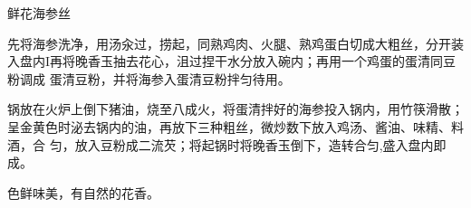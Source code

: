 \begin{recipe}{鲜花海参丝}

\ingredients


\cooking

\step 先将海参洗净，用汤汆过，捞起，同熟鸡肉、火腿、熟鸡蛋白切成大粗丝，分开装
入盘内I再将晚香玉抽去花心，沮过捏干水分放入碗内；再用一个鸡蛋的蛋清同豆粉调成
蛋清豆粉，并将海参入蛋清豆粉拌匀待用。

\step 锅放在火炉上倒下猪油，烧至八成火，将蛋清拌好的海参投入锅内，用竹筷滑散；
呈金黄色时泌去锅内的油，再放下三种粗丝，微炒数下放入鸡汤、酱油、味精、料酒，合
匀，放入豆粉成二流芡；将起锅时将晚香玉倒下，造转合匀,盛入盘内即成。

\features

色鲜味美，有自然的花香。

\end{recipe}

